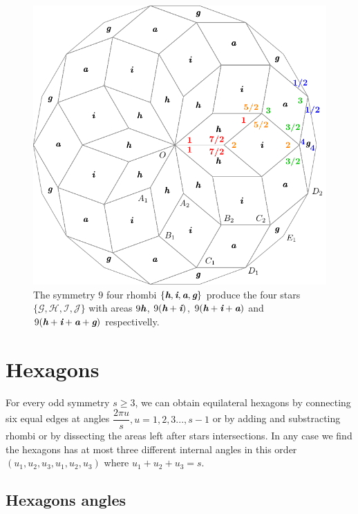 \documentclass[11pt]{article}
\def\mathbi#1{\textbf{\em #1}}
\begin{document}
\begin{figure}[H]
\centering
\includegraphics[scale=1]{rhombi-9}
\caption{The symmetry $9$ four rhombi $\{\mathbi{h},\mathbi{i},\mathbi{a},\mathbi{g}\}$ produce the four stars $\{\mathcal{G},\mathcal{H},\mathcal{I},\mathcal{J}\}$ with areas
$9\mathbi{h}$,
 $9(\mathbi{h}+\mathbi{i})$,
 $9(\mathbi{h}+\mathbi{i}+\mathbi{a})$ and 
 $9(\mathbi{h}+\mathbi{i}+\mathbi{a}+\mathbi{g})$ respectivelly.}
\label{fig:rhombi-9}
\end{figure}





\section{Hexagons}

For every odd symmetry $s \geq 3$, we can obtain equilateral hexagons by connecting six equal edges at angles $\dfrac{2\pi u}{s}, u=1,2,3...,s-1$ or by adding and substracting rhombi or by dissecting the areas left after stars intersections. In any case we find the hexagons has at most three different internal angles in this order $(u_1, u_2, u_3, u_1, u_2, u_3)$ where $u_1 + u_2 + u_3 = s$.

\subsection{Hexagons angles}
\end{document}
